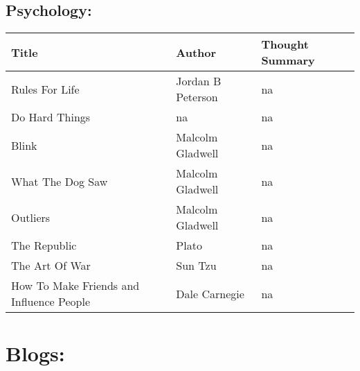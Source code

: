 \documentclass{article}
\begin{document}
\subsection*{Psychology:}
\begin{tabularx}{0.8\textwidth} { 
  | >{\centering\arraybackslash}X 
  | >{\centering\arraybackslash}X 
  | >{\centering\arraybackslash}X | }
    \hline
    Title & Author & Thought Summary\\
    \hline
    12 Rules For Life & Jordan B Peterson & na \\
    \hline
    Do Hard Things & na & na \\
    \hline
    Blink & Malcolm Gladwell & na \\
    \hline
    What The Dog Saw & Malcolm Gladwell & na \\
    \hline
    Outliers & Malcolm Gladwell & na \\
    \hline
    The Republic & Plato & na \\
    \hline
    The Art Of War & Sun Tzu & na\\
    \hline
    How To Make Friends and Influence People & Dale Carnegie & na\\
    \hline

\end{tabularx}

\section*{Blogs:}
\end{document}
